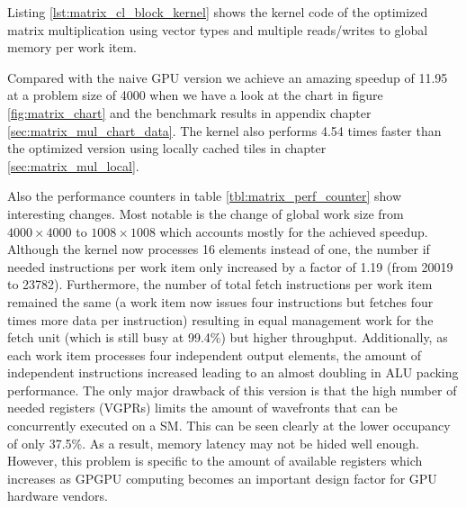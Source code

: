 Listing \ref{lst:matrix_cl_block_kernel} shows the kernel code of the optimized matrix multiplication using vector types and multiple reads/writes to global memory per work item.



Compared with the naive GPU version we achieve an amazing speedup of 11.95 at a problem size of 4000 when we have a look at the chart in figure \ref{fig:matrix_chart} and the benchmark results in appendix chapter \ref{sec:matrix_mul_chart_data}. The kernel also performs 4.54 times faster than the optimized version using locally cached tiles in chapter \ref{sec:matrix_mul_local}.

Also the performance counters in table \ref{tbl:matrix_perf_counter} show interesting changes. Most notable is the change of global work size from $4000 \times 4000$ to $1008 \times 1008$ which accounts mostly for the achieved speedup. Although the kernel now processes 16 elements instead of one, the number if needed instructions per work item only increased by a factor of 1.19 (from 20019 to 23782). Furthermore, the number of total fetch instructions per work item remained the same (a work item now issues four instructions but fetches four times more data per instruction) resulting in equal management work for the fetch unit (which is still busy at 99.4\%) but higher throughput. Additionally, as each work item processes four independent output elements, the amount of independent instructions increased leading to an almost doubling in ALU packing performance. The only major drawback of this version is that the high number of needed registers (VGPRs) limits the amount of wavefronts that can be concurrently executed on a SM. This can be seen clearly at the lower occupancy of only 37.5\%. As a result, memory latency may not be hided well enough. However, this problem is specific to the amount of available registers which increases as GPGPU computing becomes an important design factor for GPU hardware vendors.



